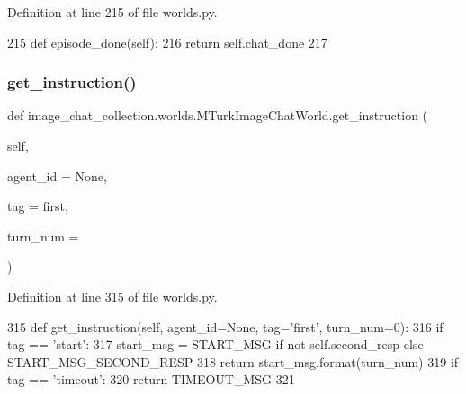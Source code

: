 Definition at line 215 of file worlds.\+py.


\begin{DoxyCode}
215     \textcolor{keyword}{def }episode\_done(self):
216         \textcolor{keywordflow}{return} self.chat\_done
217 
\end{DoxyCode}
\mbox{\label{classimage__chat__collection_1_1worlds_1_1MTurkImageChatWorld_ab3caeb29dc340a476579b1cc8d101608}} 
\subsubsection{\texorpdfstring{get\+\_\+instruction()}{get\_instruction()}}
{\footnotesize\ttfamily def image\+\_\+chat\+\_\+collection.\+worlds.\+M\+Turk\+Image\+Chat\+World.\+get\+\_\+instruction (\begin{DoxyParamCaption}\item[{}]{self,  }\item[{}]{agent\+\_\+id = {\ttfamily None},  }\item[{}]{tag = {\ttfamily \textquotesingle{}first\textquotesingle{}},  }\item[{}]{turn\+\_\+num = {} }\end{DoxyParamCaption})}



Definition at line 315 of file worlds.\+py.


\begin{DoxyCode}
315     \textcolor{keyword}{def }get\_instruction(self, agent\_id=None, tag='first', turn\_num=0):
316         \textcolor{keywordflow}{if} tag == \textcolor{stringliteral}{'start'}:
317             start\_msg = START\_MSG \textcolor{keywordflow}{if} \textcolor{keywordflow}{not} self.second\_resp \textcolor{keywordflow}{else} START\_MSG\_SECOND\_RESP
318             \textcolor{keywordflow}{return} start\_msg.format(turn\_num)
319         \textcolor{keywordflow}{if} tag == \textcolor{stringliteral}{'timeout'}:
320             \textcolor{keywordflow}{return} TIMEOUT\_MSG
321 
\end{DoxyCode}
\mbox{\label{classimage__chat__collection_1_1worlds_1_1MTurkImageChatWorld_a7af5e011cc93106144797115af770537}} 
